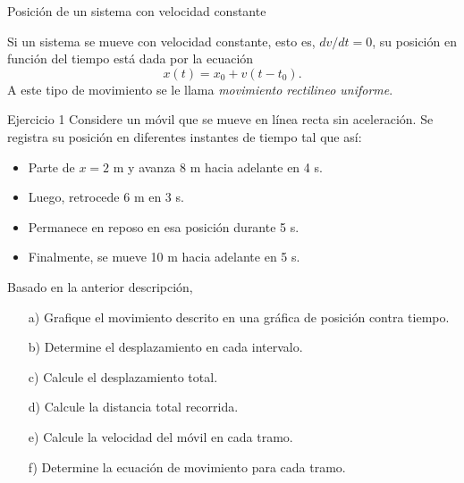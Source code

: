 \begin{frame}{Posición de un sistema con velocidad constante}

Si un sistema se mueve con velocidad constante, esto es, $dv/dt=0$, su posición en función del tiempo está dada por la ecuación
    \begin{equation}
        x(t)=x_0+v(t-t_0).
    \end{equation}
    A este tipo de movimiento se le llama \textit{movimiento rectilineo uniforme}.
\end{frame}

\begin{frame}{Ejercicio 1}
    Considere un m\'ovil que se mueve en l\'inea recta sin aceleraci\'on. Se registra su posici\'on en diferentes instantes de tiempo tal que as\'i:
    \begin{itemize}
        \item Parte de $x = 2$ m y avanza 8 m hacia adelante en 4 s.
        \item Luego, retrocede 6 m en 3 s.
        \item Permanece en reposo en esa posici\'on durante 5 s.
        \item Finalmente, se mueve 10 m hacia adelante en 5 s.
    \end{itemize}
    
    Basado en la anterior descripci\'on,
    
    \begin{itemize}
        \item[a)] Grafique el movimiento descrito en una gr\'afica de posici\'on contra tiempo.
        \item[b)] Determine el desplazamiento en cada intervalo. 
        \item[c)] Calcule el desplazamiento total.
        \item[d)] Calcule la distancia total recorrida.
        \item[e)] Calcule la velocidad del móvil en cada tramo.
        \item[f)] Determine la ecuaci\'on de movimiento para cada tramo.
    \end{itemize}

\end{frame}

